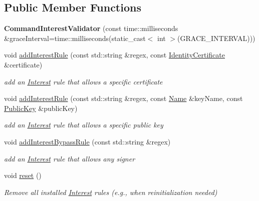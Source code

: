 \subsection*{Public Member Functions}
\begin{DoxyCompactItemize}
\item 
{\bfseries Command\+Interest\+Validator} (const time\+::milliseconds \&grace\+Interval=time\+::milliseconds(static\+\_\+cast$<$ int $>$(G\+R\+A\+C\+E\+\_\+\+I\+N\+T\+E\+R\+V\+AL)))\hypertarget{classndn_1_1CommandInterestValidator_aaa5661cd36d94ab6b404c3c49f6d988a}{}\label{classndn_1_1CommandInterestValidator_aaa5661cd36d94ab6b404c3c49f6d988a}

\item 
void \hyperlink{classndn_1_1CommandInterestValidator_a41dbbc501ae6031dee48069b209249c6}{add\+Interest\+Rule} (const std\+::string \&regex, const \hyperlink{classndn_1_1IdentityCertificate}{Identity\+Certificate} \&certificate)
\begin{DoxyCompactList}\small\item\em add an \hyperlink{classndn_1_1Interest}{Interest} rule that allows a specific certificate \end{DoxyCompactList}\item 
void \hyperlink{classndn_1_1CommandInterestValidator_ab6380cb5f6cd72fd85fb3fe9eddbad15}{add\+Interest\+Rule} (const std\+::string \&regex, const \hyperlink{classndn_1_1Name}{Name} \&key\+Name, const \hyperlink{classndn_1_1PublicKey}{Public\+Key} \&public\+Key)
\begin{DoxyCompactList}\small\item\em add an \hyperlink{classndn_1_1Interest}{Interest} rule that allows a specific public key \end{DoxyCompactList}\item 
void \hyperlink{classndn_1_1CommandInterestValidator_a5bed7ff3e017303ad2f28728fb819394}{add\+Interest\+Bypass\+Rule} (const std\+::string \&regex)
\begin{DoxyCompactList}\small\item\em add an \hyperlink{classndn_1_1Interest}{Interest} rule that allows any signer \end{DoxyCompactList}\item 
void \hyperlink{classndn_1_1CommandInterestValidator_a6d2f7fd2d95c2f1f5fd8b1a5da719736}{reset} ()\hypertarget{classndn_1_1CommandInterestValidator_a6d2f7fd2d95c2f1f5fd8b1a5da719736}{}\label{classndn_1_1CommandInterestValidator_a6d2f7fd2d95c2f1f5fd8b1a5da719736}

\begin{DoxyCompactList}\small\item\em Remove all installed \hyperlink{classndn_1_1Interest}{Interest} rules (e.\+g., when reinitialization needed) \end{DoxyCompactList}\end{DoxyCompactItemize}
